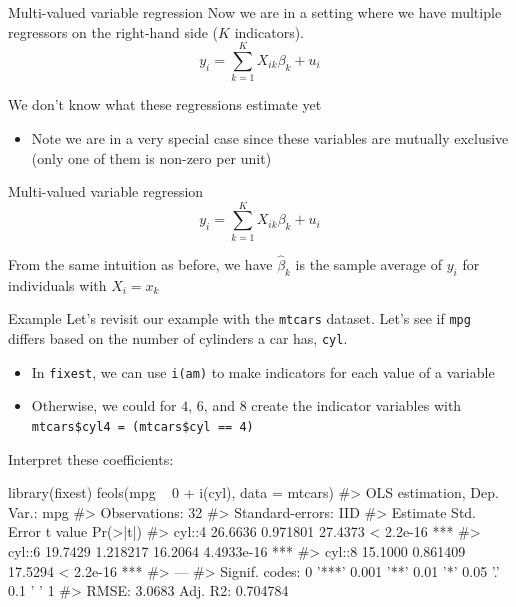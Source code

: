 \documentclass[aspectratio=169,t,11pt,table]{beamer}
\begin{document}
\begin{frame}{Multi-valued variable regression}
  Now we are in a setting where we have multiple regressors on the right-hand side ($K$ indicators). 
  $$
    y_i = \sum_{k=1}^K X_{ik} \beta_k + u_i
  $$

  \pause
  \bigskip
  We don't know what these regressions estimate yet
  \begin{itemize}
    \item Note we are in a very special case since these variables are mutually exclusive (only one of them is non-zero per unit)
  \end{itemize}
\end{frame}

\begin{frame}{Multi-valued variable regression}
  \vspace*{-\bigskipamount}
  $$
    y_i = \sum_{k=1}^K X_{ik} \beta_k + u_i
  $$

  From the same intuition as before, we have $\hat{\beta}_k$ is the sample average of $y_i$ for individuals with $X_i = x_k$
\end{frame}

\begin{frame}{Example}
  Let's revisit our example with the \texttt{mtcars} dataset. Let's see if \texttt{mpg} differs based on the number of cylinders a car has, \texttt{cyl}. 

  \begin{itemize}
    \item In \texttt{fixest}, we can use \texttt{i(am)} to make indicators for each value of a variable

    \item Otherwise, we could for $4$, $6$, and $8$ create the indicator variables with \texttt{mtcars\$cyl4 = (mtcars\$cyl == 4)}
  \end{itemize}
\end{frame}

\begin{frame}[fragile]{}
  Interpret these coefficients:

  \begin{codeblock}
library(fixest)
feols(mpg ~ 0 + i(cyl), data = mtcars)
#> OLS estimation, Dep. Var.: mpg
#> Observations: 32
#> Standard-errors: IID 
#>        Estimate Std. Error t value   Pr(>|t|)    
#> cyl::4  26.6636   0.971801 27.4373  < 2.2e-16 ***
#> cyl::6  19.7429   1.218217 16.2064 4.4933e-16 ***
#> cyl::8  15.1000   0.861409 17.5294  < 2.2e-16 ***
#> ---
#> Signif. codes:  0 '***' 0.001 '**' 0.01 '*' 0.05 '.' 0.1 ' ' 1
#> RMSE: 3.0683   Adj. R2: 0.704784
  \end{codeblock}
\end{frame}
\end{document}

